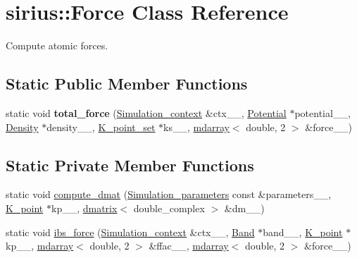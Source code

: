\hypertarget{classsirius_1_1_force}{}\section{sirius\+:\+:Force Class Reference}
\label{classsirius_1_1_force}


Compute atomic forces.  


\subsection*{Static Public Member Functions}
\begin{DoxyCompactItemize}
\item 
\hypertarget{classsirius_1_1_force_a01adf87ef1546f25a8fe29a602a1c4ae}{}static void {\bfseries total\+\_\+force} (\hyperlink{classsirius_1_1_simulation__context}{Simulation\+\_\+context} \&ctx\+\_\+\+\_\+, \hyperlink{classsirius_1_1_potential}{Potential} $\ast$potential\+\_\+\+\_\+, \hyperlink{classsirius_1_1_density}{Density} $\ast$density\+\_\+\+\_\+, \hyperlink{classsirius_1_1_k__point__set}{K\+\_\+point\+\_\+set} $\ast$ks\+\_\+\+\_\+, \hyperlink{classsddk_1_1mdarray}{mdarray}$<$ double, 2 $>$ \&force\+\_\+\+\_\+)\label{classsirius_1_1_force_a01adf87ef1546f25a8fe29a602a1c4ae}

\end{DoxyCompactItemize}
\subsection*{Static Private Member Functions}
\begin{DoxyCompactItemize}
\item 
static void \hyperlink{classsirius_1_1_force_a1c2dd9afd7532ca65d6b2faabea96ec9}{compute\+\_\+dmat} (\hyperlink{classsirius_1_1_simulation__parameters}{Simulation\+\_\+parameters} const \&parameters\+\_\+\+\_\+, \hyperlink{classsirius_1_1_k__point}{K\+\_\+point} $\ast$kp\+\_\+\+\_\+, \hyperlink{classsddk_1_1dmatrix}{dmatrix}$<$ double\+\_\+complex $>$ \&dm\+\_\+\+\_\+)
\item 
static void \hyperlink{classsirius_1_1_force_a356a57bb3c1971201d3feae6f19cf267}{ibs\+\_\+force} (\hyperlink{classsirius_1_1_simulation__context}{Simulation\+\_\+context} \&ctx\+\_\+\+\_\+, \hyperlink{classsirius_1_1_band}{Band} $\ast$band\+\_\+\+\_\+, \hyperlink{classsirius_1_1_k__point}{K\+\_\+point} $\ast$kp\+\_\+\+\_\+, \hyperlink{classsddk_1_1mdarray}{mdarray}$<$ double, 2 $>$ \&ffac\+\_\+\+\_\+, \hyperlink{classsddk_1_1mdarray}{mdarray}$<$ double, 2 $>$ \&force\+\_\+\+\_\+)
\end{DoxyCompactItemize}


